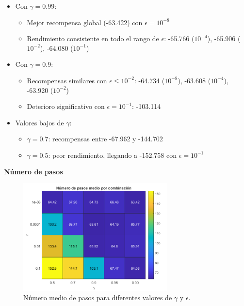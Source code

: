 \begin{itemize}
    \item Con $\gamma = 0.99$:
    \begin{itemize}
        \item Mejor recompensa global (-63.422) con $\epsilon = 10^{-8}$
        \item Rendimiento consistente en todo el rango de $\epsilon$: -65.766 ($10^{-4}$), -65.906 ($10^{-2}$), -64.080 ($10^{-1}$)
    \end{itemize}
    \item Con $\gamma = 0.9$:
    \begin{itemize}
        \item Recompensas similares con $\epsilon \leq 10^{-2}$: -64.734 ($10^{-8}$), -63.608 ($10^{-4}$), -63.920 ($10^{-2}$)
        \item Deterioro significativo con $\epsilon = 10^{-1}$: -103.114
    \end{itemize}
    \item Valores bajos de $\gamma$:
    \begin{itemize}
        \item $\gamma = 0.7$: recompensas entre -67.962 y -144.702
        \item $\gamma = 0.5$: peor rendimiento, llegando a -152.758 con $\epsilon = 10^{-1}$
    \end{itemize}
\end{itemize}

\newpage

\textbf{Número de pasos}

\begin{figure}[H]
    \centering
    \includegraphics[width=0.7\textwidth]{../../experiments/valueIteration/experiment-1/results/steps.png}
    \caption{Número medio de pasos para diferentes valores de $\gamma$ y $\epsilon$.}
    \label{fig:stepsValueIteration}
\end{figure}

